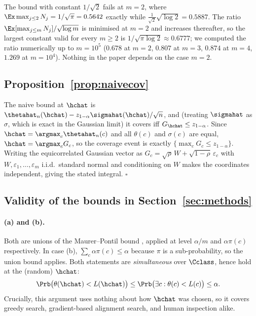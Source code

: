 \begin{remark}
The bound with constant $1/\sqrt2$ fails at $m=2$, where
$\Ex\max_{j\le 2}N_j = 1/\sqrt\pi = 0.5642$ exactly while
$\tfrac1{\sqrt2}\sqrt{\log 2}=0.5887$. The ratio
$\Ex[\max_{j\le m}N_j]/\sqrt{\log m}$ is minimised at $m=2$ and increases
thereafter, so the largest constant valid for every $m\ge2$ is
$1/\sqrt{\pi\log 2}\approx0.6777$; we computed the ratio numerically up to
$m=10^5$ ($0.678$ at $m=2$, $0.807$ at $m=3$, $0.874$ at $m=4$, $1.269$ at
$m=10^4$). Nothing in the paper depends on the case $m=2$.
\end{remark}

\subsection{Proposition~\ref{prop:naivecov}}

The naive bound at $\hchat$ is
$\thetahat_n(\hchat)-z_{1-\alpha}\sigmahat(\hchat)/\sqrt n$, and (treating
$\sigmahat$ as $\sigma$, which is exact in the Gaussian limit) it covers iff
$G_{\hchat}\le z_{1-\alpha}$. Since $\hchat=\argmax_c\thetahat_n(c)$ and all
$\theta(c)$ and $\sigma(c)$ are equal, $\hchat=\argmax_c G_c$, so the coverage
event is exactly $\{\max_c G_c\le z_{1-\alpha}\}$. Writing the equicorrelated
Gaussian vector as $G_c=\sqrt\rho\,W+\sqrt{1-\rho}\,\varepsilon_c$ with
$W,\varepsilon_1,\dots,\varepsilon_m$ i.i.d.\ standard normal and conditioning on
$W$ makes the coordinates independent, giving the stated integral.
\hfill$\square$

\subsection{Validity of the bounds in Section~\ref{sec:methods}}

\paragraph{(a) and (b).} Both are unions of the Maurer--Pontil bound
\citep[Thm.~4]{maurer2009empirical}, applied at level $\alpha/m$ and
$\alpha\pi(c)$ respectively. In case (b), $\sum_c \alpha\pi(c)\le\alpha$ because
$\pi$ is a sub-probability, so the union bound applies. Both statements are
\emph{simultaneous} over $\Cclass$, hence hold at the (random) $\hchat$:
\[
\Prb\big(\theta(\hchat)<L(\hchat)\big)\le\Prb\big(\exists c:\theta(c)<L(c)\big)\le\alpha .
\]
Crucially, this argument uses nothing about how $\hchat$ was chosen, so it covers
greedy search, gradient-based alignment search, and human inspection alike.

